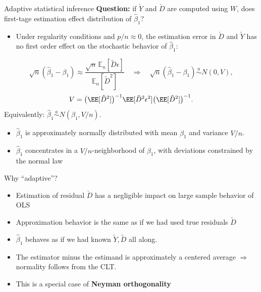 \documentclass[compress, 8pt]{beamer}
\begin{document}
\begin{frame}{Adaptive statistical inference}
    \textbf{Question: } if $\check{Y}$ and $\check{D}$ are computed using $W$, does first-tage estimation effect distribution of $\hat{\beta}_1$?
    \begin{itemize}
        \item [$\implies$] Under regularity conditions and $p/n \approx 0$, the estimation error in $\check{D}$ and $\check{Y}$ has no first order effect on the stochastic behavior of $\hat{\beta}_1$:
    \end{itemize}
    \begin{equation*}
        \sqrt{n}(\hat\beta_1 - \beta_1) \approx
        \frac{\sqrt{n}\, \mathbb{E}_n[\tilde{D}\epsilon]}{\mathbb{E}_n[\tilde{D}^2]}
        \quad \Rightarrow \quad
        \sqrt{n}(\hat\beta_1 - \beta_1) \overset{a}{\sim} N(0, V),
    \end{equation*}
    \begin{equation*}
        V = \big(\EE[\tilde{D}^2]\big)^{-1} \EE[\tilde{D}^2 \epsilon^2] \big(\EE[\tilde{D}^2]\big)^{-1}.
    \end{equation*}
    Equivalently: $\hat\beta_1 \overset{a}{\sim} N(\beta_1, V/n)$.
    \begin{itemize}
        \item $\hat{\beta}_1$ is approximately normally distributed with mean $\beta_1$ and variance $V/n$.
        \item [$\implies$] $\hat{\beta}_1$ concentrates in a $V/n$-neighborhood of $\beta_1$, with deviations constrained by the normal law
    \end{itemize}
\end{frame}

\begin{frame}{Why ``adaptive''?}
    \begin{itemize}
        \item Estimation of residual $\check{D}$ has a negligible impact on large sample behavior of OLS
        \item Approximation behavior is the same as if we had used true residuals $\tilde{D}$
        \item $\hat\beta_1$ behaves as if we had known $\tilde{Y}, \tilde{D}$ all along.
        \item The estimator minus the estimand is approximately a centered average
              $\Rightarrow$ normality follows from the CLT.
        \item This is a special case of \textbf{Neyman orthogonality}
            
    \end{itemize}
\end{frame}
\end{document}
